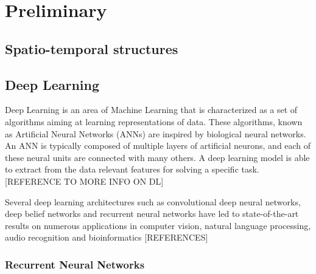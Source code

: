 
\chapter{Preliminary}
\section{Spatio-temporal structures}
\section{Deep Learning}
Deep Learning is an area of Machine Learning that is  characterized as a set of algorithms aiming at learning  representations of data.  These algorithms, known as Artificial Neural Networks (ANNs) are inspired by biological neural networks. An ANN is typically composed of multiple layers of artificial neurons, and each of these neural units are connected with many others. A deep learning model is able to extract from the data relevant features for solving a specific task. [REFERENCE TO MORE INFO ON DL]

Several deep learning architectures such as convolutional deep neural networks, deep belief networks and recurrent neural networks have led to state-of-the-art results on numerous applications in computer vision, natural language processing, audio recognition and bioinformatics [REFERENCES]  

\subsection{Recurrent Neural Networks}